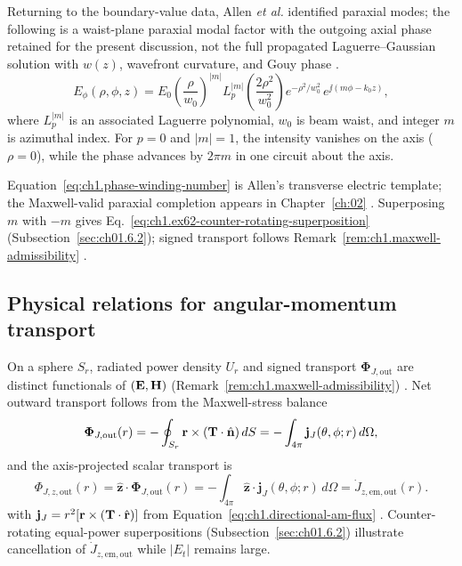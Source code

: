 Returning to the boundary-value data, Allen \emph{et al.} \cite{allen1992} identified paraxial modes; the following is a waist-plane paraxial modal factor with the outgoing axial phase retained for the present discussion, not the full propagated Laguerre--Gaussian solution with $w(z)$, wavefront curvature, and Gouy phase \cite{allen1992}.
\begin{equation}
\label{eq:ch1.phase-winding-number}
E_\phi(\rho,\phi,z)
=
E_0
\left(\frac{\rho}{w_0}\right)^{|m|}
L_p^{|m|}\!\left(\frac{2\rho^2}{w_0^2}\right)
e^{-\rho^2/w_0^2}\,
e^{\jj(m\phi-k_0 z)},
\end{equation}
where \(L_p^{|m|}\) is an associated Laguerre polynomial, \(w_0\) is beam waist,
and integer \(m\) is azimuthal index. For \(p=0\) and \(|m|=1\), the intensity vanishes
on the axis (\(\rho=0\)), while the phase advances by \(2\pi m\) in one circuit about the axis.

Equation~\eqref{eq:ch1.phase-winding-number} is Allen's transverse electric template; the Maxwell-valid paraxial completion appears in Chapter~\ref{ch:02} \cite{allen1992,stratton1941,cerjan2011,monteiro2009}. Superposing $m$ with $-m$ gives Eq.~\eqref{eq:ch1.ex62-counter-rotating-superposition} (Subsection~\ref{sec:ch01.6.2}); signed transport follows Remark~\ref{rem:ch1.maxwell-admissibility} \cite{maxwell1873,beth1936,stratton1941}.

\subsection{Physical relations for angular-momentum transport}
\label{sec:ch01.2.3}

On a sphere $S_r$, radiated power density $U_r$ and signed transport $\boldsymbol{\Phi}_{J,\mathrm{out}}$ are distinct functionals of $(\mathbf{E},\mathbf{H})$ (Remark~\ref{rem:ch1.maxwell-admissibility}) \cite{stratton1941,beth1936,poynting1884}. Net outward transport follows from the Maxwell-stress balance
\begin{equation}
\label{eq:ch1.am-net-transport-condition}
\boldsymbol{\Phi}_{J,\mathrm{out}}(r)=-\oint_{S_r}\mathbf{r}\times(\mathbf{T}\cdot\hat{\mathbf{n}})\,dS
=-\int_{4\pi}\mathbf{j}_J(\theta,\phi;r)\,d\Omega,
\end{equation}
and the axis-projected scalar transport is
\begin{equation}
\label{eq:ch1.am-net-transport-z}
\Phi_{J,z,\mathrm{out}}(r)=\hat{\mathbf{z}}\cdot\boldsymbol{\Phi}_{J,\mathrm{out}}(r)
=-\int_{4\pi}\hat{\mathbf{z}}\cdot\mathbf{j}_J(\theta,\phi;r)\,d\Omega
=\dot J_{z,\mathrm{em,out}}(r).
\end{equation}
with $\mathbf{j}_J=r^2[\mathbf{r}\times(\mathbf{T}\cdot\hat{\mathbf{r}})]$ from Equation~\eqref{eq:ch1.directional-am-flux} \cite{stratton1941,beth1936}. Counter-rotating equal-power superpositions (Subsection~\ref{sec:ch01.6.2}) illustrate cancellation of $\dot J_{z,\mathrm{em,out}}$ while $|E_t|$ remains large.
\label{eq:ch1.flux-qualified-decision}%
\label{eq:ch1.transport-charge-continuous-index}%
\label{tab:ch1.triad-numeric-dipole}

